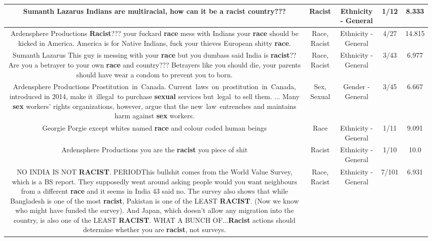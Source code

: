 \documentclass[11pt]{article}
\newlength\mylength
\begin{document}
\begin{center}
\begin{longtable}{|C{.65\mylength}|C{.30\mylength}|C{.12\mylength}|C{.12\mylength}|C{.12\mylength}|}
  \small Sumanth Lazarus Indians are multiracial, how can it be a \textbf{racist} country???\normalsize   & Racist & Ethnicity - General & 1/12 & 8.333 \\  \hline
  \small Ardensphere Productions \textbf{Racist}??? your  fuckard \textbf{race} mess with Indians your \textbf{race} should be kicked in America. America is for Native Indians, fuck your thieves European shitty \textbf{race}.\normalsize   & Race, Racist & Ethnicity - General & 4/27 & 14.815 \\  \hline
  \small Sumanth Lazarus This guy is messing with your \textbf{race} but you dumbass said India is \textbf{racist}?? Are you a betrayer to your own \textbf{race} and country??? Betrayers like you should die, your parents should have wear a condom to prevent you to born.\normalsize   & Race, Racist & Ethnicity - General & 3/43 & 6.977 \\  \hline
  \small Ardensphere Productions Prostitution in Canada. Current laws on prostitution in Canada, introduced in 2014, make it illegal to purchase \textbf{sexual} services but legal to sell them. ... Many \textbf{sex} workers' rights organizations, however, argue that the new law entrenches and maintains harm against \textbf{sex} workers.\normalsize   & Sex, Sexual & Gender - General & 3/45 & 6.667 \\  \hline
  \small Georgie Porgie except whites named \textbf{race} and colour coded human beings\normalsize   & Race & Ethnicity - General & 1/11 & 9.091 \\  \hline
  \small Ardensphere Productions you are the \textbf{racist} you piece of shit\normalsize   & Racist & Ethnicity - General & 1/10 & 10.0 \\  \hline
  \small NO INDIA IS NOT \textbf{RACIST}. PERIODThis bullshit comes from the World Value Survey, which is a BS report. They supposedly went around asking people would you want neighbours from a different \textbf{race} and it seems in India 43 said no. The survey also shows that while Bangladesh is one of the most \textbf{racist}, Pakistan is one of the LEAST \textbf{RACIST}. (Now we know who might have funded the survey). And Japan, which doesn't allow any migration into the country, is also one of the LEAST \textbf{RACIST}. WHAT A BUNCH OF...\textbf{Racist} actions should determine whether you are \textbf{racist}, not surveys.\normalsize   & Race, Racist & Ethnicity - General & 7/101 & 6.931 \\  \hline

\end{longtable}
\end{center}
\end{document}
